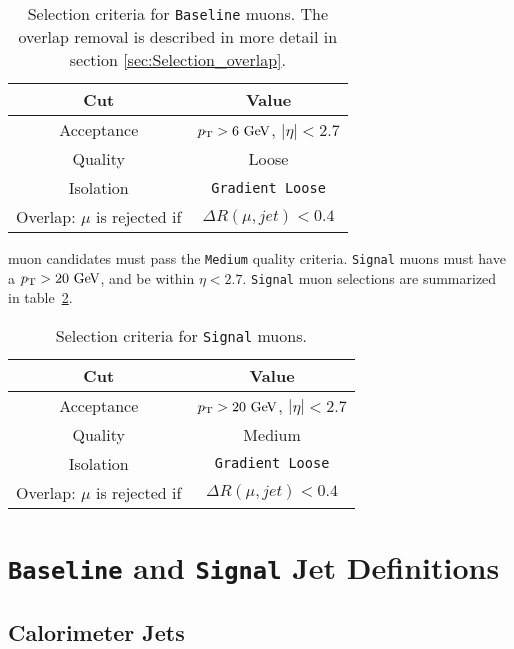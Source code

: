 \begin{table}[htp]
  \begin{center}
    \begin{tabular}{c|c} \hline \hline
      Cut & Value \\ \hline \hline
      Acceptance & $\pT > 6\gev$, $|\eta| < 2.7$ \\ \hline
      Quality & Loose \\ \hline
      Isolation & {\tt Gradient Loose} \\ \hline
      Overlap: $\mu$ is rejected if &  $ \Delta R(\mu,jet) < 0.4 $ \\ \hline
      \hline
    \end{tabular}
  \caption{Selection criteria for {\tt Baseline} muons. The overlap removal is described in more detail in section \ref{sec:Selection_overlap}.} 
  \end{center}
  \label{tb:muons:baseline}
\end{table}%

 muon candidates must pass the {\tt Medium} quality criteria.  {\tt Signal} muons must have a $\pT > 20 \gev$, and be within $\eta < 2.7$.  {\tt Signal} muon selections are summarized in table~\ref{tb:muons:signal}. \\  

\begin{table}[htp]
  \begin{center}
    \begin{tabular}{c|c} \hline \hline
      Cut & Value \\ \hline \hline
      Acceptance & $\pT > 20\gev$, $|\eta| < 2.7$ \\ \hline
      Quality & Medium \\ \hline
      Isolation & {\tt Gradient Loose} \\ \hline
      Overlap: $\mu$ is rejected if &  $ \Delta R(\mu,jet) < 0.4 $ \\ \hline
      \hline
    \end{tabular}
  \caption{Selection criteria for {\tt Signal} muons.} 
  \end{center}
  \label{tb:muons:signal}
\end{table}%

\section{{\tt Baseline} and {\tt Signal} Jet Definitions}
\subsection{Calorimeter Jets}
\label{sec:def:jets}

